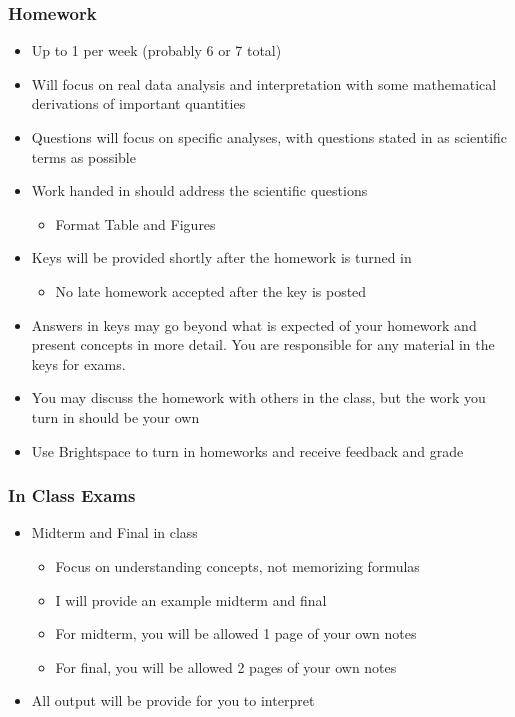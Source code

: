 \documentclass[
  letterpaper,
  DIV=11,
  numbers=noendperiod]{scrartcl}
\providecommand{\tightlist}{%
  \setlength{\itemsep}{0pt}\setlength{\parskip}{0pt}}\usepackage{longtable,booktabs,array}
\begin{document}
\hypertarget{homework}{%
\subsubsection{Homework}\label{homework}}

\begin{itemize}
\tightlist
\item
  Up to 1 per week (probably 6 or 7 total)
\item
  Will focus on real data analysis and interpretation with some
  mathematical derivations of important quantities
\item
  Questions will focus on specific analyses, with questions stated in as
  scientific terms as possible
\item
  Work handed in should address the scientific questions

  \begin{itemize}
  \tightlist
  \item
    Format Table and Figures
  \end{itemize}
\item
  Keys will be provided shortly after the homework is turned in

  \begin{itemize}
  \tightlist
  \item
    No late homework accepted after the key is posted
  \end{itemize}
\item
  Answers in keys may go beyond what is expected of your homework and
  present concepts in more detail. You are responsible for any material
  in the keys for exams.
\item
  You may discuss the homework with others in the class, but the work
  you turn in should be your own
\item
  Use Brightspace to turn in homeworks and receive feedback and grade
\end{itemize}

\hypertarget{in-class-exams}{%
\subsubsection{In Class Exams}\label{in-class-exams}}

\begin{itemize}
\tightlist
\item
  Midterm and Final in class

  \begin{itemize}
  \tightlist
  \item
    Focus on understanding concepts, not memorizing formulas
  \item
    I will provide an example midterm and final
  \item
    For midterm, you will be allowed 1 page of your own notes
  \item
    For final, you will be allowed 2 pages of your own notes
  \end{itemize}
\item
  All output will be provide for you to interpret
\end{itemize}
\end{document}
